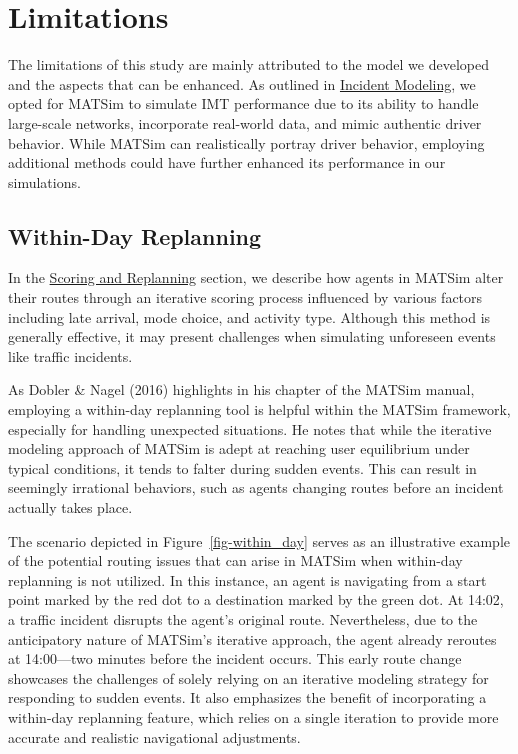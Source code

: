 \documentclass[fancy, oneside, mastersfancy, ms]{byuthesis}
\begin{document}
\hypertarget{sec-limitations}{%
\section{Limitations}\label{sec-limitations}}

The limitations of this study are mainly attributed to the model we
developed and the aspects that can be enhanced. As outlined in
\protect\hyperlink{sec-inc_modeling}{Incident Modeling}, we opted for
MATSim to simulate IMT performance due to its ability to handle
large-scale networks, incorporate real-world data, and mimic authentic
driver behavior. While MATSim can realistically portray driver behavior,
employing additional methods could have further enhanced its performance
in our simulations.

\hypertarget{sec-within-day}{%
\subsection{Within-Day Replanning}\label{sec-within-day}}

In the \protect\hyperlink{sec-MATSim_Score}{Scoring and Replanning}
section, we describe how agents in MATSim alter their routes through an
iterative scoring process influenced by various factors including late
arrival, mode choice, and activity type. Although this method is
generally effective, it may present challenges when simulating
unforeseen events like traffic incidents.

As Dobler \& Nagel (2016) highlights in his chapter of the MATSim
manual, employing a within-day replanning tool is helpful within the
MATSim framework, especially for handling unexpected situations. He
notes that while the iterative modeling approach of MATSim is adept at
reaching user equilibrium under typical conditions, it tends to falter
during sudden events. This can result in seemingly irrational behaviors,
such as agents changing routes before an incident actually takes place.

The scenario depicted in Figure~\ref{fig-within_day} serves as an
illustrative example of the potential routing issues that can arise in
MATSim when within-day replanning is not utilized. In this instance, an
agent is navigating from a start point marked by the red dot to a
destination marked by the green dot. At 14:02, a traffic incident
disrupts the agent's original route. Nevertheless, due to the
anticipatory nature of MATSim's iterative approach, the agent already
reroutes at 14:00---two minutes before the incident occurs. This early
route change showcases the challenges of solely relying on an iterative
modeling strategy for responding to sudden events. It also emphasizes
the benefit of incorporating a within-day replanning feature, which
relies on a single iteration to provide more accurate and realistic
navigational adjustments.
\end{document}
